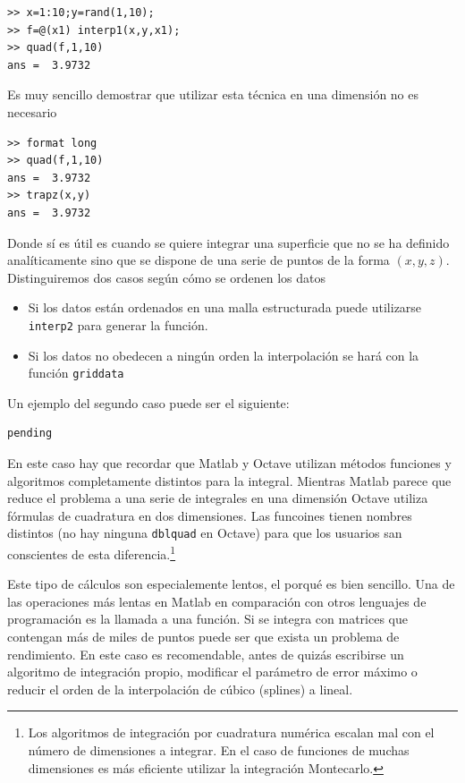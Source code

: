 \begin{verbatim}
>> x=1:10;y=rand(1,10);
>> f=@(x1) interp1(x,y,x1);
>> quad(f,1,10)
ans =  3.9732
\end{verbatim}

Es muy sencillo demostrar que utilizar esta técnica en una dimensión
no es necesario

\begin{verbatim}
>> format long
>> quad(f,1,10)
ans =  3.9732
>> trapz(x,y)
ans =  3.9732
\end{verbatim}

Donde sí es útil es cuando se quiere integrar una superficie que no se
ha definido analíticamente sino que se dispone de una serie de puntos
de la forma $(x,y,z)$.  Distinguiremos dos casos según cómo se ordenen
los datos

\begin{itemize}
\item Si los datos están ordenados en una malla estructurada puede
  utilizarse \texttt{interp2} para generar la función.
\item Si los datos no obedecen a ningún orden la interpolación se hará
  con la función \texttt{griddata}
\end{itemize}

Un ejemplo del segundo caso puede ser el siguiente:

\begin{verbatim}
pending
\end{verbatim}

En este caso hay que recordar que Matlab y Octave utilizan métodos
funciones y algoritmos completamente distintos para la
integral. Mientras Matlab parece que reduce el problema a una serie de
integrales en una dimensión Octave utiliza fórmulas de cuadratura en
dos dimensiones. Las funcoines tienen nombres distintos (no hay
ninguna \texttt{dblquad} en Octave) para que los usuarios san
conscientes de esta diferencia.\footnote{Los algoritmos de integración
por cuadratura numérica escalan mal con el número de dimensiones a
integrar.  En el caso de funciones de muchas dimensiones es más
eficiente utilizar la integración Montecarlo.}

Este tipo de cálculos son especialemente lentos, el porqué es bien
sencillo.  Una de las operaciones más lentas en Matlab en comparación
con otros lenguajes de programación es la llamada a una función.  Si
se integra con matrices que contengan más de miles de puntos puede ser
que exista un problema de rendimiento.  En este caso es recomendable,
antes de quizás escribirse un algoritmo de integración propio,
modificar el parámetro de error máximo o reducir el orden de la
interpolación de cúbico (splines) a lineal.

